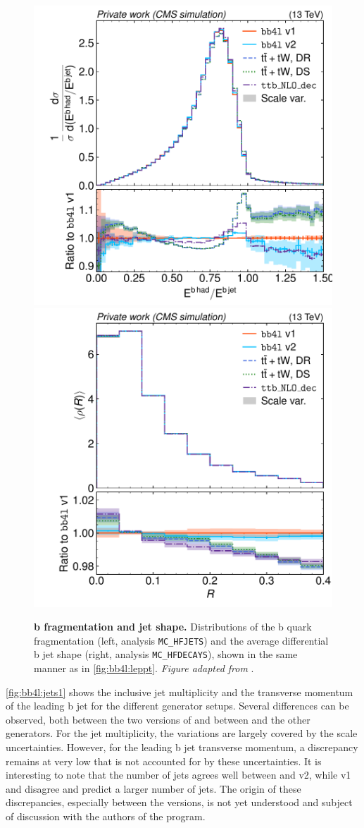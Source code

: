 \begin{figure}[tp]
    \centering
    \includegraphics[width=0.49 \textwidth]{figures/bb4l/generators/MC_HFJETS_efracB.pdf}
    \hfill
    \includegraphics[width=0.49 \textwidth]{figures/bb4l/generators/MC_HFDECAYS_avg_rho_B_jet.pdf}
    \caption{\textbf{b fragmentation and jet shape.} Distributions of the b quark fragmentation (left, \rivet analysis \texttt{MC\_HFJETS}) and the average differential b jet shape (right, \rivet analysis \texttt{MC\_HFDECAYS}), shown in the same manner as in \cref{fig:bb4l:leppt}. \textit{Figure adapted from }.}
    \label{fig:bb4l:jets2}
\end{figure}

\cref{fig:bb4l:jets1} shows the inclusive jet multiplicity and the transverse momentum of the leading b jet for the different generator setups. Several differences can be observed, both between the two versions of \bbfourl and between \bbfourl and the other generators. For the jet multiplicity, the variations are largely covered by the scale uncertainties. However, for the leading b jet transverse momentum, a discrepancy remains at very low \pt that is not accounted for by these uncertainties.
It is interesting to note that the number of jets agrees well between \tttWsum and \bbfourl v2, while \bbfourl v1 and \ttb disagree and predict a larger number of jets. The origin of these discrepancies, especially between the \bbfourl versions, is not yet understood and subject of discussion with the authors of the program.


